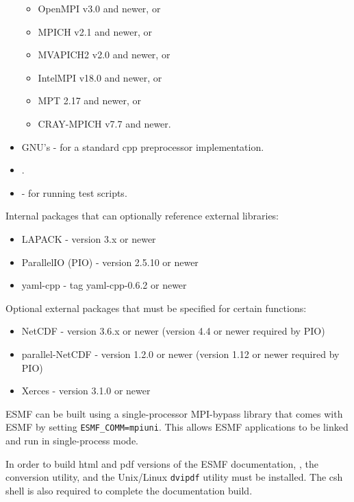 \begin{itemize}
  \begin{itemize}
  \item OpenMPI v3.0 and newer, or
  \item MPICH v2.1 and newer, or
  \item MVAPICH2 v2.0 and newer, or
  \item IntelMPI v18.0 and newer, or
  \item MPT 2.17 and newer, or
  \item CRAY-MPICH v7.7 and newer.
  \end{itemize}
\item GNU's  -
for a standard cpp preprocessor implementation.
\item {}.
\item {} - for running
test scripts.
\end{itemize}

Internal packages that can optionally reference external libraries:
\begin{itemize}
\item LAPACK - version 3.x or newer
\item ParallelIO (PIO) - version 2.5.10 or newer
\item yaml-cpp - tag yaml-cpp-0.6.2 or newer
\end{itemize}

Optional external packages that must be specified for certain functions:
\begin{itemize}
\item NetCDF - version 3.6.x or newer (version 4.4 or newer required by PIO)
\item parallel-NetCDF - version 1.2.0 or newer (version 1.12 or newer required by PIO)
\item Xerces - version 3.1.0 or newer
\end{itemize}

ESMF can be built using a single-processor MPI-bypass library
that comes with ESMF by setting {\tt ESMF\_COMM=mpiuni}. This allows ESMF applications
to be linked and run in single-process mode.

In order to build html and pdf versions of the ESMF documentation, 
,
the 
conversion utility, and the Unix/Linux {\tt dvipdf} utility must be installed.
The csh shell is also required to complete the documentation build.
